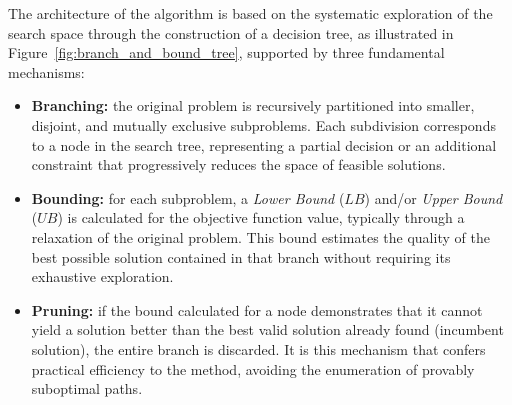 The architecture of the algorithm is based on the systematic exploration of the search space through the construction of a decision tree, as illustrated in Figure~\ref{fig:branch_and_bound_tree}, supported by three fundamental mechanisms:

\begin{itemize}
    \item \textbf{Branching:} the original problem is recursively partitioned into smaller, disjoint, and mutually exclusive subproblems. Each subdivision corresponds to a node in the search tree, representing a partial decision or an additional constraint that progressively reduces the space of feasible solutions.
    \item \textbf{Bounding:} for each subproblem, a \textit{Lower Bound} ($LB$) and/or \textit{Upper Bound} ($UB$) is calculated for the objective function value, typically through a relaxation of the original problem. This bound estimates the quality of the best possible solution contained in that branch without requiring its exhaustive exploration.
    \item \textbf{Pruning:} if the bound calculated for a node demonstrates that it cannot yield a solution better than the best valid solution already found (incumbent solution), the entire branch is discarded. It is this mechanism that confers practical efficiency to the method, avoiding the enumeration of provably suboptimal paths.
\end{itemize}

